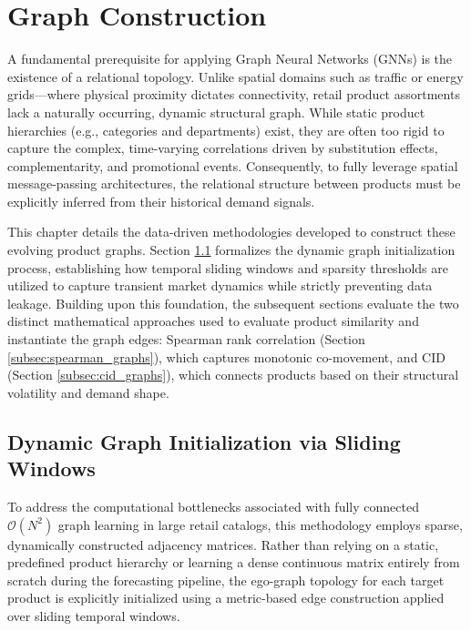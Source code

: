 \chapter{Graph Construction}
\label{chap:graph_construction}

A fundamental prerequisite for applying Graph Neural Networks (GNNs) is the existence of a relational topology. Unlike spatial domains such as traffic or energy grids—where physical proximity dictates connectivity, retail product assortments lack a naturally occurring, dynamic structural graph. While static product hierarchies (e.g., categories and departments) exist, they are often too rigid to capture the complex, time-varying correlations driven by substitution effects, complementarity, and promotional events. Consequently, to fully leverage spatial message-passing architectures, the relational structure between products must be explicitly inferred from their historical demand signals.

This chapter details the data-driven methodologies developed to construct these evolving product graphs. Section \ref{sec:dynamic_graph_init} formalizes the dynamic graph initialization process, establishing how temporal sliding windows and sparsity thresholds are utilized to capture transient market dynamics while strictly preventing data leakage. Building upon this foundation, the subsequent sections evaluate the two distinct mathematical approaches used to evaluate product similarity and instantiate the graph edges: Spearman rank correlation (Section \ref{subsec:spearman_graphs}), which captures monotonic co-movement, and \ac{CID} (Section \ref{subsec:cid_graphs}), which connects products based on their structural volatility and demand shape.

\section{Dynamic Graph Initialization via Sliding Windows}
\label{sec:dynamic_graph_init}

To address the computational bottlenecks associated with fully connected $\mathcal{O}(N^2)$ graph learning in large retail catalogs, this methodology employs sparse, dynamically constructed adjacency matrices. Rather than relying on a static, predefined product hierarchy or learning a dense continuous matrix entirely from scratch during the forecasting pipeline, the ego-graph topology for each target product is explicitly initialized using a metric-based edge construction applied over sliding temporal windows.

